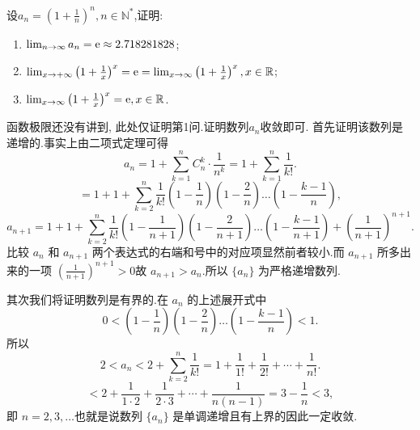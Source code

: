 \begin{example}\label{example:e_n}
    设$a_n= \left(1+ \frac 1n \right)^n , n \in \mathbb{N}^*$,证明:
    \begin{enumerate}
        \item $\lim_{n \to \infty} a_n = \mathrm{e} \approx 2.718281828$;
        \item $\lim_{x\to  +\infty } \left( 1 +\frac 1x \right)^x = \mathrm{e} = \lim_{x \to  \infty } \left(1 +\frac 1x \right)^x,x \in \mathbb R $;
        \item $\lim_{x \to \infty} \left(1 +\frac 1x \right)^x = \mathrm{e}, x \in \mathbb R$.
    \end{enumerate}

    \begin{solution}
        函数极限还没有讲到, 此处仅证明第1问.证明数列$a_n$收敛即可.
        首先证明该数列是递增的.事实上由二项式定理可得
        $$
            a_n = 1 + \sum_{k=1}^{n} C_n^k \cdot \frac{1}{n^k} = 1 + \sum_{k=1}^{n} \frac{1}{k!}.
        $$
        $$
            = 1 + 1 + \sum_{k=2}^{n} \frac{1}{k!} \left( 1 - \frac{1}{n} \right) \left( 1 - \frac{2}{n} \right) \dots \left( 1 - \frac{k-1}{n} \right),
        $$
        $$
            a_{n+1} = 1 + 1 + \sum_{k=2}^{n} \frac{1}{k!} \left( 1 - \frac{1}{n+1} \right) \left( 1 - \frac{2}{n+1} \right) \dots \left( 1 - \frac{k-1}{n+1} \right) + \left( \frac{1}{n+1} \right)^{n+1}.
        $$
        比较 $a_n$ 和 $a_{n+1}$ 两个表达式的右端和号中的对应项显然前者较小.而 $a_{n+1}$ 所多出来的一项 $\left( \frac{1}{n+1} \right)^{n+1} > 0$故 $a_{n+1} > a_n$.所以 $\{a_n\}$ 为严格递增数列.

        其次我们将证明数列是有界的.在 $a_n$ 的上述展开式中
        $$
            0 < \left( 1 - \frac{1}{n} \right) \left( 1 - \frac{2}{n} \right) \dots \left( 1 - \frac{k-1}{n} \right) < 1.
        $$
        所以
        $$
            2 < a_n < 2 + \sum_{k=2}^{n} \frac{1}{k!} = 1 + \frac{1}{1!} + \frac{1}{2!} + \cdots + \frac{1}{n!}.
        $$
        $$
            < 2 + \frac{1}{1 \cdot 2} + \frac{1}{2 \cdot 3} + \cdots + \frac{1}{n(n-1)} = 3 - \frac{1}{n} < 3,
        $$
        即 $n = 2, 3, \dots$也就是说数列 $\{a_n\}$ 是单调递增且有上界的因此一定收敛.
    \end{solution}

\end{example}

